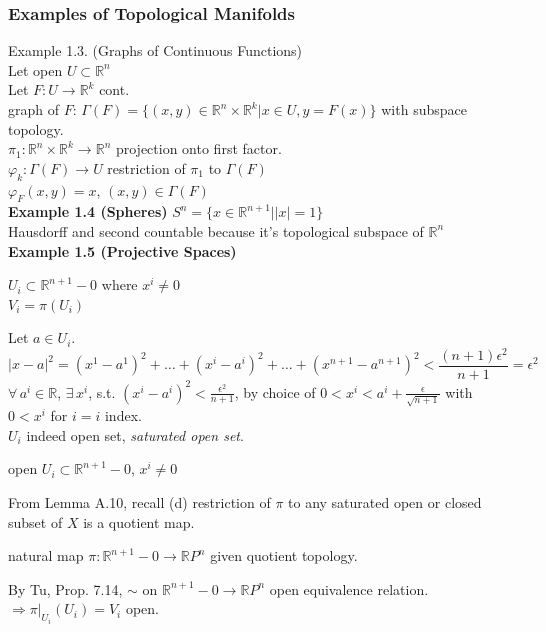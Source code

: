 \subsubsection*{Examples of Topological Manifolds}

Example 1.3. (Graphs of Continuous Functions) \\
Let open $U \subset \mathbb{R}^n$ \\
Let $F: U \to \mathbb{R}^k$ cont. \\
graph of $F$: $\Gamma(F) = \lbrace (x,y) \in \mathbb{R}^n \times \mathbb{R}^k | x \in U , y = F(x) \rbrace$ with subspace topology. \\
$\pi_1 : \mathbb{R}^n \times \mathbb{R}^k \to \mathbb{R}^n$ projection onto first factor. \\
$\varphi_k:\Gamma(F) \to U$ restriction of $\pi_1$ to $\Gamma(F)$ \\
$\varphi_F(x,y) = x$, $(x,y) \in \Gamma(F)$ \\

\textbf{Example 1.4 (Spheres)} $S^n = \lbrace x \in \mathbb{R}^{n+1} | |x| = 1 \rbrace$ \\
Hausdorff and second countable because it's topological subspace of $\mathbb{R}^n$   \\


\textbf{Example 1.5 (Projective Spaces)}

$U_i \subset \mathbb{R}^{n+1} - 0$ where $x^i \neq 0$  \\
$V_i = \pi(U_i)$  

Let $a\in U_i$. 
\[
|x-a|^2 = (x^1 - a^1)^2 + \dots + (x^i - a^i)^2 + \dots + (x^{n+1} - a^{n+1})^2 < \frac{ (n+1) \epsilon^2 }{ n + 1 } = \epsilon^2
\]
$\forall \, a^i \in \mathbb{R}$, $\exists \,  x^i$, s.t. $(x^i - a^i)^2 < \frac{ \epsilon^2}{ n +1}$, by choice of $0< x^i < a^i + \frac{ \epsilon}{ \sqrt{ n+ 1} }$ with $0<x^i$ for $i=i$ index.  \\
$U_i$ indeed open set, \emph{saturated open set}.  

open $U_i \subset \mathbb{R}^{n+1} - 0$, $x^i \neq 0$
 
From Lemma A.10, recall
(d) restriction of $\pi$ to any saturated open or closed subset of $X$ is a quotient map.  

natural map $\pi: \mathbb{R}^{n+1} - 0 \to \mathbb{R}P^n$ given quotient topology.  

By Tu, Prop. 7.14, $\sim $ on $\mathbb{R}^{n+1} - 0  \to \mathbb{R}P^n$ open equivalence relation.  \\
$\Longrightarrow  \left. \pi \right|_{U_i}(U_i) = V_i$ open.  

